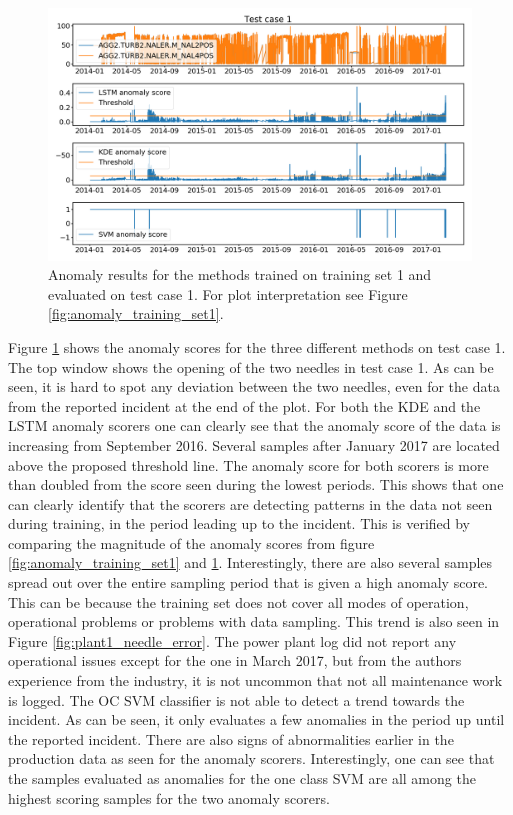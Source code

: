         \begin{figure}
            \centering
            \includegraphics[width = \textwidth]{report/figures/analysis/plant1_training/production_data_anomaly.png}
            \caption{Anomaly results for the methods trained on training set 1 and evaluated on test case 1. For plot interpretation see Figure \ref{fig:anomaly_training_set1}.}
            \label{fig:anomaly_plant_1_train_production}
        \end{figure}
        Figure \ref{fig:anomaly_plant_1_train_production} shows the anomaly scores for the three different methods on test case 1. The top window shows the opening of the two needles in test case 1. As can be seen, it is hard to spot any deviation between the two needles, even for the data from the reported incident at the end of the plot. For both the KDE and the LSTM anomaly scorers one can clearly see that the anomaly score of the data is increasing from September 2016. Several samples after January 2017 are located above the proposed threshold line. The anomaly score for both scorers is more than doubled from the score seen during the lowest periods. This shows that one can clearly identify that the scorers are detecting patterns in the data not seen during training, in the period leading up to the incident. This is verified by comparing the magnitude of the anomaly scores from figure \ref{fig:anomaly_training_set1} and \ref{fig:anomaly_plant_1_train_production}. Interestingly, there are also several samples spread out over the entire sampling period that is given a high anomaly score. This can be because the training set does not cover all modes of operation, operational problems or problems with data sampling. This trend is also seen in Figure \ref{fig:plant1_needle_error}. The power plant log did not report any operational issues except for the one in March 2017, but from the authors experience from the industry, it is not uncommon that not all maintenance work is logged. The OC SVM classifier is not able to detect a trend towards the incident. As can be seen, it only evaluates a few anomalies in the period up until the reported incident. There are also signs of abnormalities earlier in the production data as seen for the anomaly scorers. Interestingly, one can see that the samples evaluated as anomalies for the one class SVM are all among the highest scoring samples for the two anomaly scorers. 
        
